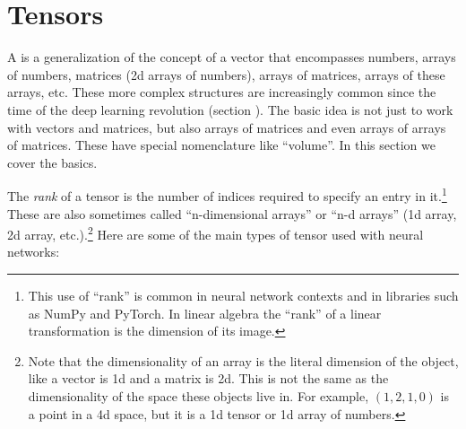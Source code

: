
\section{Tensors}\label{sect_tensors}


A  is a generalization of the concept of a vector that encompasses numbers, arrays of numbers, matrices (2d arrays of numbers), arrays of matrices, arrays of these arrays, etc. These more complex structures are increasingly common since the time of the deep learning revolution (section ). The basic idea is not just to work with vectors and matrices, but also arrays of matrices and even arrays of arrays of matrices. These have special nomenclature like ``volume''. In this section we cover the basics.

The \emph{rank} of a  tensor is the number of indices required to specify an entry in it.\footnote{This use of ``rank'' is common in neural network contexts and in libraries such as NumPy and PyTorch. In linear algebra the ``rank''  of a linear transformation is the dimension of its image.} These are also sometimes called ``n-dimensional arrays'' or ``n-d arrays'' (1d array, 2d array, etc.).\footnote{Note that the dimensionality of an array is the literal dimension of the object, like a vector is 1d and a matrix is 2d. This is not the same as the dimensionality of the space these objects live in. For example, $(1,2,1,0)$ is a point in a 4d space, but it is a 1d tensor or 1d array of numbers.} Here are some of the main types of tensor used with neural networks:

